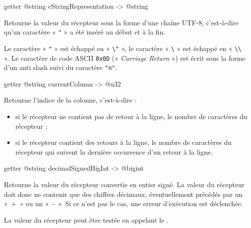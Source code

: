 \begin{galgas4box}
getter @string cStringRepresentation -> @string
\end{galgas4box}

Retourne la valeur du récepteur sous la forme d'une chaîne UTF-8, c'est-à-dire qu'un caractère « \texttt{"} » a été inséré au début et à la fin.

Le caractère « \texttt{"} » est échappé en « \texttt{\textbackslash"} », le caractère « \texttt{\textbackslash} » est échappé en « \texttt{\textbackslash\textbackslash} ». Le caractère de code ASCII \texttt{0x0D} (« \emph{Carriage Return} ») est écrit sous la forme d'un anti slash suivi du caractère \texttt{"n"}.








\begin{galgas4box}
getter @string currentColumn -> @u32
\end{galgas4box}

Retourne l'indice de la colonne, c'est-à-dire :
\begin{itemize}
\item si le récepteur ne contient pas de retour à la ligne, le nombre de caractères du récepteur ;
\item si le récepteur contient des retours à la ligne, le nombre de caractères du récepteur qui suivent la dernière occurrence d'un retour à la ligne.
\end{itemize}








\begin{galgas4box}
getter @string decimalSignedBigInt -> @bigint
\end{galgas4box}

Retourne la valeur du récepteur convertie en entier signé. La valeur du récepteur doit donc ne contenir que des chiffres décimaux, éventuellement précédés par un «~+~» ou un «~-~». Si ce n'est pas le cas, une erreur d'exécution est déclenchée.

La valeur du récepteur peut être testée en appelant le .







